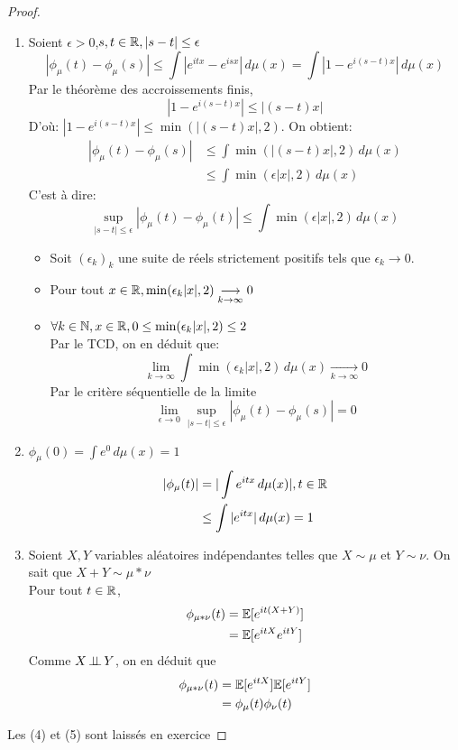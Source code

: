 \documentclass[]{report}
\begin{document}
    \begin{proof}
        \begin{enumerate}
            \item Soient $\epsilon>0$,$s,t\in \mathbb{R},|s-t|\le \epsilon$
            \[|\phi_\mu(t)-\phi_\mu(s)|\le \int |e^{itx}-e^{isx}|\, d\mu(x)=\int |1-e^{i(s-t)x}|\, d\mu(x)\]
            Par le théorème des accroissements finis,
            \[|1-e^{i(s-t)x}|\le |(s-t)x|\]
            D'où: $|1-e^{i(s-t)x}|\le \min(|(s-t)x|,2)$. On obtient:
            \begin{align*}
                |\phi_\mu(t)-\phi_{\mu}(s)|&\le \int\min(|(s-t)x|,2)\, d\mu(x)\\
                &\le \int \min(\epsilon|x|,2)\,d\mu(x) 
            \end{align*}
            C'est à dire:
            \[\sup_{|s-t|\le \epsilon}|\phi_{\mu}(t)-\phi_{\mu}(t)|\le \int \min(\epsilon |x|,2)\,d\mu(x)\]
            \begin{itemize}
                \item Soit $(\epsilon_k)_k$ une suite de réels strictement positifs tels que $\epsilon_k\longrightarrow 0$.
                \item Pour tout $x\in \mathbb{R},\min(\epsilon_k |x|,2)\underset{k\to \infty}{\longrightarrow}0$
                \item $\forall k\in \mathbb{N}, x\in \mathbb{R}, 0\le \min(\epsilon_k|x|,2)\le 2$\\
                Par le TCD, on en déduit que:
                \[\lim_{k\to \infty} \int \min(\epsilon_k|x|,2)\,d\mu(x)\underset{k\to \infty}{\longrightarrow}0\]
                Par le critère séquentielle de la limite
                \[\lim_{\epsilon\to 0} \sup_{|s-t|\le \epsilon}|\phi_\mu(t)-\phi_\mu(s)|=0\]
            \end{itemize}
            \item $\phi_\mu(0)=\int e^0\,d\mu(x)=1$
            \begin{align*}
                |\phi_\mu(t)|&=|\int e^{itx}\,d\mu (x)|, t\in \mathbb{R}\\
                &\le \int |e^{itx}|\,d\mu(x)=1
            \end{align*}
            \item Soient $X,Y$ variables aléatoires indépendantes telles que $X\sim \mu$ et $Y\sim\nu$. On sait que $X+Y\sim \mu*\nu$\\
            Pour tout $t\in \mathbb{R}$,
            \begin{align*}
                \phi_{\mu*\nu}(t)&=\mathbb{E}[e^{it(X+Y)}]\\
                &=\mathbb{E}[e^{itX}e^{itY}]
            \end{align*}
            Comme $X\operatorname{\perp \!\!\! \perp} Y$, on en déduit que
            \begin{align*}
                \phi_{\mu*\nu}(t)&=\mathbb{E}[e^{itX}]\mathbb{E}[e^{itY}]\\
                &=\phi_\mu(t)\phi_\nu(t)
            \end{align*}
        \end{enumerate}
        Les (4) et (5) sont laissés en exercice
    \end{proof}
\end{document}
